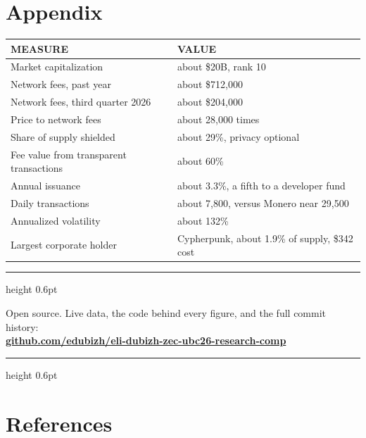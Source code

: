 \documentclass[11pt]{article}
\begin{document}
\section*{Appendix }
\vspace{6pt}

\begin{center}
\begin{tabular}{@{}ll@{}}
\toprule
{\sffamily\footnotesize\color{mid}MEASURE} & {\sffamily\footnotesize\color{mid}VALUE} \\
\midrule
Market capitalization & about \$20B, rank 10 \\
Network fees, past year & about \$712,000 \\
Network fees, third quarter 2026 & about \$204,000 \\
Price to network fees & about 28,000 times \\
Share of supply shielded & about 29\%, privacy optional \\
Fee value from transparent transactions & about 60\% \\
Annual issuance & about 3.3\%, a fifth to a developer fund \\
Daily transactions & about 7,800, versus Monero near 29,500 \\
Annualized volatility & about 132\% \\
Largest corporate holder & Cypherpunk, about 1.9\% of supply, \$342 cost \\
\bottomrule
\end{tabular}
\end{center}

\vspace{14pt}
\begin{center}
{\color{zecgold}\hrule height 0.6pt}
\vspace{7pt}
{\sffamily\footnotesize\color{ink} Open source. Live data, the code behind every figure, and the full commit history:\\[3pt]
{\bfseries\color{zecgold}\href{https://github.com/edubizh/eli-dubizh-zec-ubc26-research-comp}{github.com/edubizh/eli-dubizh-zec-ubc26-research-comp}}}
\vspace{7pt}
{\color{zecgold}\hrule height 0.6pt}
\end{center}

\clearpage
\section*{References}
\end{document}
